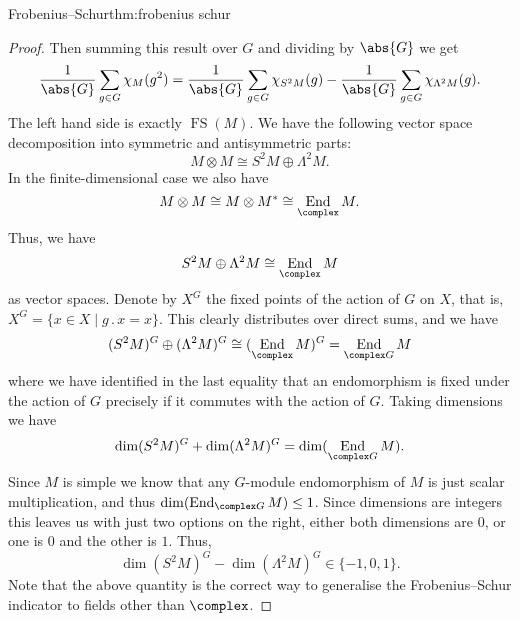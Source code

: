 \documentclass[fleqn]{NotesClass}
\DeclareMathOperator{\End}{End}
\newcommand{\action}{\mathbin{.}}
\newcommand{\isomorphic}{\cong}
\DeclareMathOperator{\frobeniusSchur}{FS}
\begin{document}
\begin{thm}{Frobenius--Schur}{thm:frobenius schur}
\begin{proof}
            Then summing this result over \(G\) and dividing by \(\abs{G}\) we get
            \begin{equation}
                \frac{1}{\abs{G}} \sum_{g \in G} \chi_M(g^2) = \frac{1}{\abs{G}} \sum_{g \in G} \chi_{S^2M}(g) - \frac{1}{\abs{G}} \sum_{g \in G} \chi_{\Lambda^2 M}(g).
            \end{equation}
            The left hand side is exactly \(\frobeniusSchur(M)\).
            We have the following vector space decomposition into symmetric and antisymmetric parts:
            \begin{equation}
                M \otimes M \isomorphic S^2M \oplus \Lambda^2M.
            \end{equation}
            In the finite-dimensional case we also have
            \begin{equation}
                M \otimes M \isomorphic M \otimes M^* \isomorphic \End_{\complex} M.
            \end{equation}
            Thus, we have
            \begin{equation}
                S^2M \oplus \Lambda^2M \isomorphic \End_{\complex} M
            \end{equation}
            as vector spaces.
            Denote by \(X^G\) the fixed points of the action of \(G\) on \(X\), that is, \(X^G = \{x \in X \mid g \action x = x\}\).
            This clearly distributes over direct sums, and we have
            \begin{equation}
                (S^2M)^G \oplus (\Lambda^2M)^G \isomorphic (\End_{\complex} M)^G = \End_{\complex G} M
            \end{equation}
            where we have identified in the last equality that an endomorphism is fixed under the action of \(G\) precisely if it commutes with the action of \(G\).
            Taking dimensions we have
            \begin{equation}
                \dim(S^2M)^G + \dim (\Lambda^2 M)^G = \dim (\End_{\complex G}M).
            \end{equation}
            Since \(M\) is simple we know that any \(G\)-module endomorphism of \(M\) is just scalar multiplication, and thus \(\dim(\End_{\complex G} M) \le 1\).
            Since dimensions are integers this leaves us with just two options on the right, either both dimensions are \(0\), or one is \(0\) and the other is \(1\).
            Thus, 
            \begin{equation}
                \dim(S^2M)^G - \dim(\Lambda^2M)^G \in \{-1, 0, 1\}.
            \end{equation}
            Note that the above quantity is the correct way to generalise the Frobenius--Schur indicator to fields other than \(\complex\).
            

\end{proof}
\end{thm}
\end{document}
